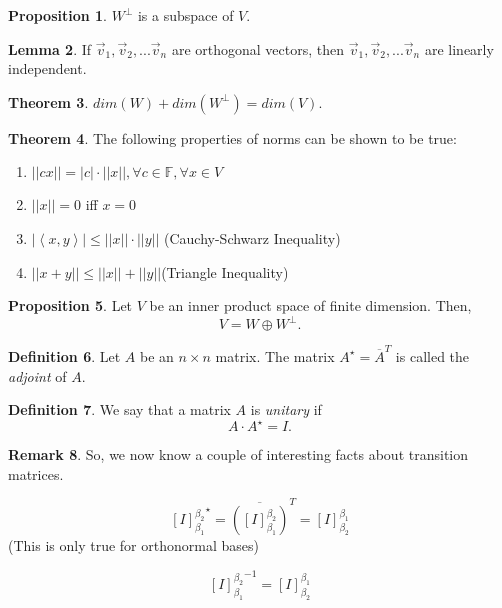 \documentclass[a5paper]{article}
\theoremstyle{definition}%
\newtheorem{theorem}{Theorem}
\numberwithin{theorem}{section} %
\newtheorem{definition}[theorem]{Definition}
\newtheorem{lemma}[theorem]{Lemma}
\newtheorem{proposition}[theorem]{Proposition}
\newtheorem{remark}[theorem]{Remark}
\newcommand{\F}{\mathbb{F}}
\newcommand*\conj[1]{\overline{#1}}
\newcommand{\inner}[1]{\left< #1 \right>}
\begin{document}
\begin{proposition}
$W^\perp$ is a subspace of $V$.
\end{proposition}

\begin{lemma}
If $\vec{v}_1, \vec{v}_2, ... \vec{v}_n$ are orthogonal vectors, then $\vec{v}_1, \vec{v}_2, ...\vec{v}_n$ are linearly independent.
\end{lemma}

\begin{theorem}
$dim(W) + dim(W^\perp) = dim(V).$
\end{theorem}

\begin{theorem}
The following properties of norms can be shown to be true:
\begin{enumerate}
\item $||cx||=|c| \cdot ||x||, \forall c \in \F, \forall x \in V$
\item $||x|| = 0$ iff $x=0$
\item $|\inner{x,y}| \leq ||x|| \cdot ||y||$ (Cauchy-Schwarz Inequality)
\item $||x+y|| \leq ||x|| + ||y|| $(Triangle Inequality)
\end{enumerate}
\end{theorem}

\begin{proposition}
Let $V$ be an inner product space of finite dimension. Then, 
$$V=W \oplus W^\perp.$$
\end{proposition}

\begin{definition}
Let $A$ be an $n \times n$ matrix. The matrix $A^\star=\conj{A}^T$ is called the \emph{adjoint} of $A$.
\end{definition}

\begin{definition}
We say that a matrix $A$ is \emph{unitary} if $$A \cdot A^\star = I.$$
\end{definition}

\begin{remark}
So, we now know a couple of interesting facts about transition matrices. 

$${[I]_{\beta_1}^{\beta_2}}^\star = \conj{\left([I]_{\beta_1}^{\beta_2}\right)}^T = [I]_{\beta_2}^{\beta_1}$$
(This is only true for orthonormal bases)


$${[I]_{\beta_1}^{\beta_2}}^{-1} = [I]_{\beta_2}^{\beta_1}$$
\end{remark}
\end{document}
